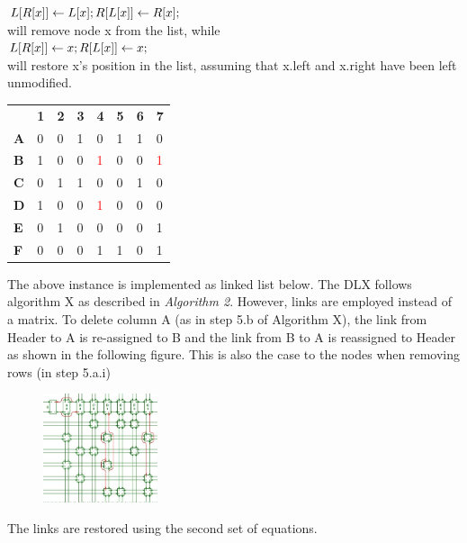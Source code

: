 \documentclass[a4paper,oneside,11pt]{report}
\begin{document}
$L[R[x]] \leftarrow L[x];\\
R[L[x]] \leftarrow R[x];$\\
will remove node x from the list, while\\
$L[R[x]] \leftarrow x;\\
R[L[x]] \leftarrow x;$\\
will restore x’s position in the list, assuming that x.left and x.right have been left unmodified.
\begin{center}
\begin{tabular}{ m{0.5cm}  m{0.5cm} m{0.5cm} m{0.5cm} m{0.5cm} m{0.5cm} m{0.5cm} m{0.5cm}} 
& \textbf{1} & \textbf{2} & \textbf{3} & \textbf{4} & \textbf{5} & \textbf{6} & \textbf{7}\\ 
\textbf{A} & 0 & 0 & 1 & 0 & 1 & 1 & 0\\ 
\textbf{B} & 1 & 0 & 0 & \textcolor{red}{1} & 0 & 0 & \textcolor{red}{1}\\ 
\textbf{C} & 0 & 1 & 1 & 0 & 0 & 1 & 0\\
\textbf{D} & 1 & 0 & 0 & \textcolor{red}{1} & 0 & 0 & 0\\
\textbf{E} & 0 & 1 & 0 & 0 & 0 & 0 & 1\\
\textbf{F} & 0 & 0 & 0 & 1 & 1 & 0 & 1\\
\end{tabular}
\end{center}

The above instance is implemented as linked list below. The DLX follows algorithm X as described in \textit{Algorithm 2}.  However, links are employed instead of a matrix. To delete column A (as in step 5.b of Algorithm X), the link from Header to A is re-assigned to B and the link from B to A is reassigned to Header as shown in the following figure. This is also the case to the nodes when removing rows (in step 5.a.i)
\begin{figure}[h]
  \centering
  {\includegraphics[width=0.3\textwidth]{dlxlinkedlist.jpg}\label{fig:linkedlist}}
\end{figure}
\newline
The links are restored using the second set of equations.
\end{document}
